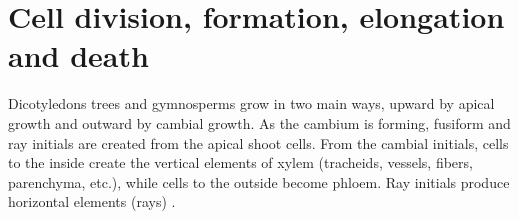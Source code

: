 \section{Cell division, formation, elongation and death}
Dicotyledons trees and gymnosperms grow in two main ways, upward by apical growth and
outward by cambial growth.  As the cambium is forming, fusiform and ray initials
are created from the apical shoot cells. From the cambial initials,
cells to the inside create the vertical elements of xylem (tracheids, vessels,
fibers, parenchyma, etc.), while cells to the outside become phloem. Ray
initials produce horizontal elements (rays) \cite{fromm2013cellular}.